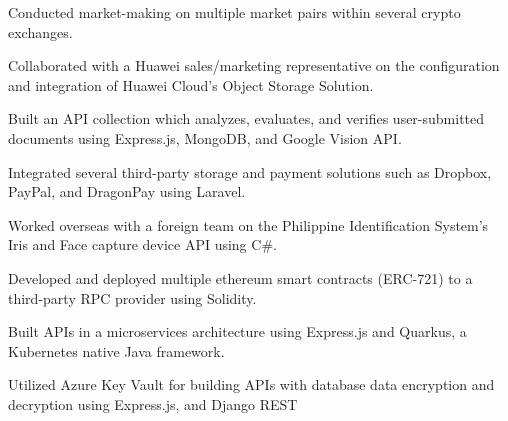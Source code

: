 \begin{cventries}
{\begin{cvitems}
        \item {Conducted market-making on multiple market pairs within several crypto exchanges.}
        \item {Collaborated with a Huawei sales/marketing representative on the configuration and integration of Huawei Cloud's Object Storage Solution.}
        \item {Built an API collection which analyzes, evaluates, and verifies user-submitted documents using Express.js, MongoDB, and Google Vision API.}
        \item {Integrated several third-party storage and payment solutions such as Dropbox, PayPal, and DragonPay using Laravel.}
        \item {Worked overseas with a foreign team on the Philippine Identification System's Iris and Face capture device API using C\#.}
        \item {Developed and deployed multiple ethereum smart contracts (ERC-721) to a third-party RPC provider using Solidity.}
        \item {Built APIs in a microservices architecture using Express.js and Quarkus, a Kubernetes native Java framework.}
        \item {Utilized Azure Key Vault for building APIs with database data encryption and decryption using Express.js, and Django REST}
      \end{cvitems}
    }
\end{cventries}
